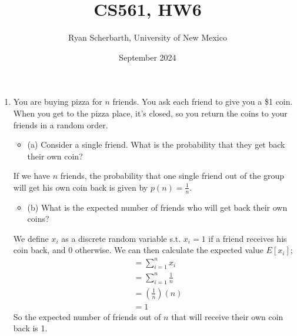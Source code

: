 \documentclass{article}
\title{CS561, HW6}
\author{Ryan Scherbarth, University of New Mexico}
\date{September 2024}
\begin{document}
\maketitle

\begin{enumerate}

\item You are buying pizza for $n$ friends. You ask each friend to give you a \$1 coin. When you get to the pizza place, it's closed, so you return the coins to your friends in a random order. 
\newline
\begin{itemize}
    \item (a) Consider a single friend. What is the probability that they get back their own coin?
\end{itemize}
If we have $n$ friends, the probability that one single friend out of the group will get his own coin back is given by $p(n) = \frac{1}{n}$. \\
\newline 








\begin{itemize}
    \item (b) What is the expected number of friends who will get back their own coins?
\end{itemize}
We define $x_i$ as a discrete random variable s.t. $x_i = 1$ if a friend receives his coin back, and 0 otherwise. We can then calculate the expected value $E[x_i]$; 
\begin{align*}
    & = \sum_{i=1}^{n}x_i \\
    & = \sum_{i=1}^{n} \frac{1}{n} \\
    & = (\frac{1}{n})(n) \\
    & = 1
\end{align*}
So the expected number of friends out of $n$ that will receive their own coin back is 1. \\
\newline







\end{enumerate}
\end{document}

